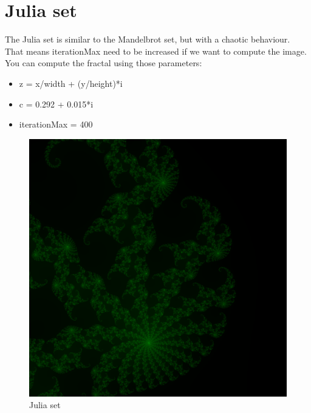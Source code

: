 \documentclass{article}
\begin{document}
\section{Julia set}
The Julia set is similar to the Mandelbrot set, but with a chaotic behaviour. That means iterationMax need to be increased if we want to compute the image. You can compute the fractal using those parameters:
\begin{itemize}
	\item z = x/width + (y/height)*i
	\item c = 0.292 + 0.015*i
	\item iterationMax = 400
\end{itemize}
\begin{figure}[H]
	\centering
	\includegraphics[scale=0.4]{figures/julia.png}
	\caption{Julia set}
\end{figure}
\end{document}
